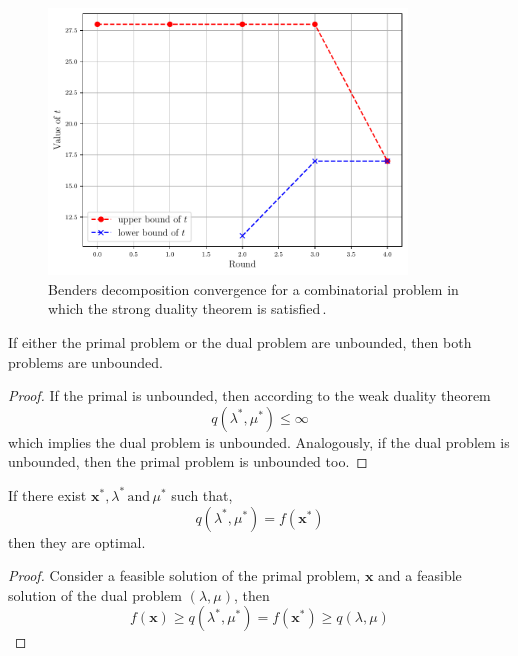\begin{figure}[H]
\centering
\includegraphics[width=0.85\textwidth]{Figures/BD_Convergence.pdf} 
\caption{Benders decomposition convergence for a combinatorial problem in which the strong duality theorem is satisfied\,\cite{Zhao2021HybridProgramming}.}
\label{fig:BD_Convergence}
\end{figure}
\begin{corollary}{}{}
If either the primal problem or the dual problem are unbounded, then both problems are unbounded.
\end{corollary}
\begin{proof}
If the primal is unbounded, then according to the weak duality theorem
\begin{equation}
    q(\lambda^{*}, \mu^{*}) \leq \infty
\end{equation}
which implies the dual problem is unbounded. Analogously, if the dual problem is unbounded, then the primal problem is unbounded too.
\end{proof}
\begin{corollary}{}{}
If there exist $\textbf{x}^{*},\lambda^{*}\,\text{and}\, \mu^{*}$ such that,
\begin{equation}
    q(\lambda^{*}, \mu^{*}) = f(\textbf{x}^{*})
\end{equation}
then they are optimal.
\end{corollary}
\begin{proof}
Consider a feasible solution of the primal problem, $\textbf{x}$ and a feasible solution of the dual problem $(\lambda, \mu)$, then
\begin{equation}
    f(\textbf{x}) \geq q(\lambda^{*}, \mu^{*}) = f(\textbf{x}^{*}) \geq q(\lambda, \mu)
\end{equation}
\end{proof}
